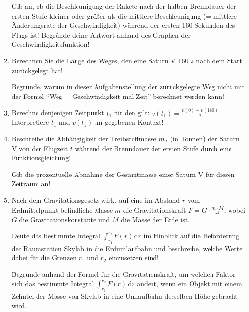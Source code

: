 \begin{langesbeispiel}
\begin{enumerate}
Gib an, ob die Beschleunigung der Rakete nach der halben Brenndauer der ersten
Stufe kleiner oder größer als die mittlere Beschleunigung (= mittlere Änderungsrate der
Geschwindigkeit) während der ersten 160 Sekunden des Flugs ist! Begründe deine Antwort anhand des Graphen der Geschwindigkeitsfunktion!

\item Berechnen Sie die Länge des Weges, den eine Saturn V 160 $s$ nach dem Start zurückgelegt hat!

Begründe, warum in dieser Aufgabenstellung der zurückgelegte Weg nicht mit der
Formel "`Weg = Geschwindigkeit mal Zeit"' berechnet werden kann!
	
\item Berechne denjenigen Zeitpunkt $t_1$ für den gilt: $v(t_1)=\frac{v(0)-v(160)}{2}$.\\
Interpretiere $t_1$ und $v(t_1)$ im gegebenen Kontext!

\item Beschreibe die Abhängigkeit der Treibstoffmasse $m_T$ (in Tonnen) der Saturn V von der Flugzeit $t$ während der Brenndauer der ersten Stufe durch eine Funktionsgleichung!

Gib die prozentuelle Abnahme der Gesamtmasse einer Saturn V für diesen Zeitraum an!

\item Nach dem Gravitationsgesetz wirkt auf eine im Abstand $r$ vom Erdmittelpunkt befindliche Masse $m$ die Gravitationskraft $F=G\cdot\frac{m\cdot M}{r^2}$, wobei $G$ die Gravitationskonstante und $M$ die Masse der Erde ist.

Deute das bestimmte Integral $\int^{r_2}_{r_1}{F(r)}$\,d$r$ im Hinblick auf die Beförderung der Raumstation Skylab in die Erdumlaufbahn und beschreibe, welche Werte dabei für die Grenzen $r_1$ und $r_2$ einzusetzen sind!

Begründe anhand der Formel für die Gravitationskraft, um welchen Faktor sich das bestimmte Integral $\int^{r_2}_{r_1}{F(r)}$\,d$r$ ändert, wenn ein Objekt mit einem Zehntel der Masse von Skylab in eine Umlaufbahn derselben Höhe gebracht wird.
	
						\end{enumerate}\leer
				
\end{langesbeispiel}
